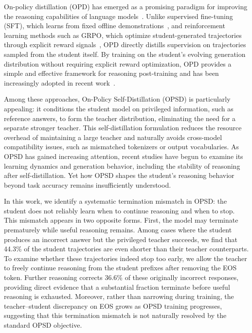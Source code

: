 \documentclass{article} %
\begin{document}
On-policy distillation (OPD) has emerged as a promising paradigm for improving the reasoning capabilities of language models~\citep{gkd,gu2026minillmonpolicydistillationlarge,lu2025onpolicydistillation}. Unlike supervised fine-tuning (SFT), which learns from fixed offline demonstrations~\citep{ho-etal-2023-large,he2026studentintheloopchainofthoughtdistillationgenerationtime}, and reinforcement learning methods such as GRPO, which optimize student-generated trajectories through explicit reward signals~\citep{shao2024deepseekmathpushinglimitsmathematical,yu2025dapoopensourcellmreinforcement}, OPD directly distills supervision on trajectories sampled from the student itself. By training on the student's evolving generation distribution without requiring explicit reward optimization, OPD provides a simple and effective framework for reasoning post-training and has been increasingly adopted in recent work~\citep{ma2026mopdmultiteacheronpolicydistillation,deepseekai2026deepseekv4highlyefficientmilliontoken,revisitingopd,li2026rethinkingonpolicydistillationlarge}. 

Among these approaches, On-Policy Self-Distillation (OPSD)\citep{opsd} is particularly appealing: it conditions the student model on privileged information, such as reference answers, to form the teacher distribution, eliminating the need for a separate stronger teacher. This self-distillation formulation reduces the resource overhead of maintaining a large teacher and naturally avoids cross-model compatibility issues, such as mismatched tokenizers or output vocabularies. As OPSD has gained increasing attention, recent studies have begun to examine its learning dynamics and generation behavior, including the stability of reasoning after self-distillation\citep{rethinking,pibias,stableopd}. Yet how OPSD shapes the student's reasoning behavior beyond task accuracy remains insufficiently understood.


In this work, we identify a systematic termination mismatch in OPSD: the student does not reliably learn when to continue reasoning and when to stop. This mismatch appears in two opposite forms. First, the model may terminate prematurely while useful reasoning remains. Among cases where the student produces an incorrect answer but the privileged teacher succeeds, we find that 44.3\% of the student trajectories are even shorter than their teacher counterparts. To examine whether these trajectories indeed stop too early, we allow the teacher to freely continue reasoning from the student prefixes after removing the EOS token. Further reasoning corrects 36.6\% of these originally incorrect responses, providing direct evidence that a substantial fraction terminate before useful reasoning is exhausted. Moreover, rather than narrowing during training, the teacher--student discrepancy on EOS grows as OPSD training progresses, suggesting that this termination mismatch is not naturally resolved by the standard OPSD objective.
\end{document}
